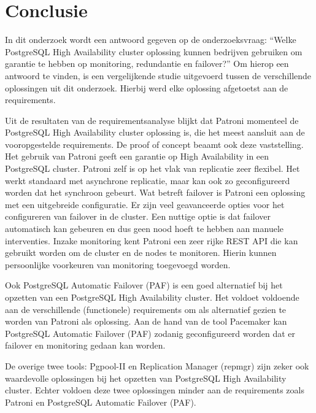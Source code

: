 
\chapter{Conclusie}
\label{ch:conclusie}

In dit onderzoek wordt een antwoord gegeven op de onderzoeksvraag: “Welke PostgreSQL High Availability cluster oplossing kunnen bedrijven gebruiken om garantie te hebben op monitoring, redundantie en failover?” Om hierop een antwoord te vinden, is een vergelijkende studie uitgevoerd tussen de verschillende oplossingen uit dit onderzoek. Hierbij werd elke oplossing afgetoetst aan de requirements.

Uit de resultaten van de requirementsanalyse blijkt dat Patroni momenteel de PostgreSQL High Availability cluster oplossing is, die het meest aansluit aan de vooropgestelde requirements. De proof of concept beaamt ook deze vaststelling. Het gebruik van Patroni geeft een garantie op High Availability in een PostgreSQL cluster. Patroni zelf is op het vlak van replicatie zeer flexibel. Het werkt standaard met asynchrone replicatie, maar kan ook zo geconfigureerd worden dat het synchroon gebeurt. Wat betreft failover is Patroni een oplossing met een uitgebreide configuratie. Er zijn veel geavanceerde opties voor het configureren van failover in de cluster. Een nuttige optie is dat failover automatisch kan gebeuren en dus geen nood hoeft te hebben aan manuele interventies. Inzake monitoring kent Patroni een zeer rijke REST API die kan gebruikt worden om de cluster en de nodes te monitoren. Hierin kunnen persoonlijke voorkeuren van monitoring toegevoegd worden.

Ook PostgreSQL Automatic Failover (PAF) is een goed alternatief bij het opzetten van een PostgreSQL High Availability cluster. Het voldoet voldoende aan de verschillende (functionele) requirements om als alternatief gezien te worden van Patroni als oplossing. Aan de hand van de tool Pacemaker kan PostgreSQL Automatic Failover (PAF) zodanig geconfigureerd worden dat er failover en monitoring gedaan kan worden.

De overige twee tools: Pgpool-II en Replication Manager (repmgr) zijn zeker ook waardevolle oplossingen bij het opzetten van PostgreSQL High Availability cluster. Echter voldoen deze twee oplossingen minder aan de requirements zoals Patroni en PostgreSQL Automatic Failover (PAF). 

